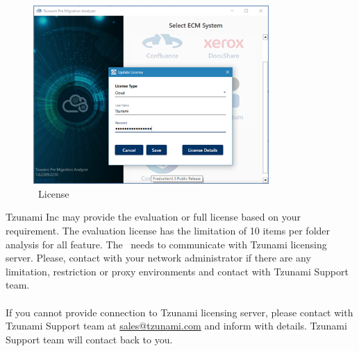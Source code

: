 \begin{figure} 
  \centering
	\includegraphics[width=0.8\textwidth]{Images/SelectEcmImage.png}
 \caption{\appName\ License}
\end{figure}
Tzunami Inc may provide the evaluation or full license based on your requirement. The evaluation license has the limitation of 10 items per folder analysis for all feature.
The \appName\ needs to communicate with Tzunami licensing server. Please, contact with your network administrator if there are any limitation, restriction or proxy environments and contact with Tzunami Support team. \\\\
If you cannot provide connection to Tzunami licensing server, please contact with Tzunami Support team at \href{mailto: sales@tzunami.com}{sales@tzunami.com} and inform with details. Tzunami Support team will contact back to you.
